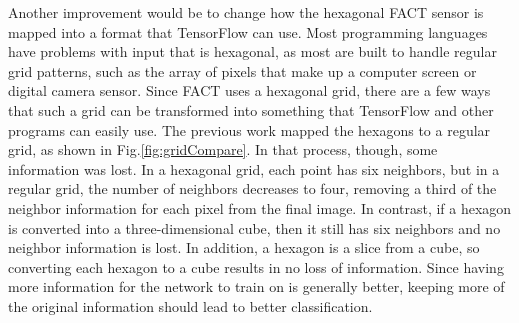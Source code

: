 \documentclass[12pt]{article}
\begin{document}
Another improvement would be to change how the hexagonal FACT sensor is mapped into a format that TensorFlow can use. Most programming languages have problems with input that is hexagonal, as most are built to handle regular grid patterns, such as the array of pixels that make up a computer screen or digital camera sensor. Since FACT uses a hexagonal grid, there are a few ways that such a grid can be transformed into something that TensorFlow and other programs can easily use. The previous work mapped the hexagons to a regular grid, as shown in Fig.\ref{fig:gridCompare}. In that process, though, some information was lost. In a hexagonal grid, each point has six neighbors, but in a regular grid, the number of neighbors decreases to four, removing a third of the neighbor information for each pixel from the final image. In contrast, if a hexagon is converted into a three-dimensional cube, then it still has six neighbors and no neighbor information is lost. In addition, a hexagon is a slice from a cube, so converting each hexagon to a cube results in no loss of information. Since having more information for the network to train on is generally better, keeping more of the original information should lead to better classification.
\end{document}
